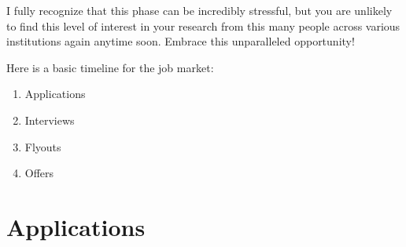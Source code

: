 \documentclass[12pt]{article}
\begin{document}
I fully recognize that this phase can be incredibly stressful, but you are unlikely to find this level of interest in your research from this many people across various institutions again anytime soon. Embrace this unparalleled opportunity!

Here is a basic timeline for the job market:
\begin{enumerate}
\item Applications
\item Interviews
\item Flyouts
\item Offers
\end{enumerate}

\section{Applications}
\label{sec:orgdde4c8d}
\end{document}

